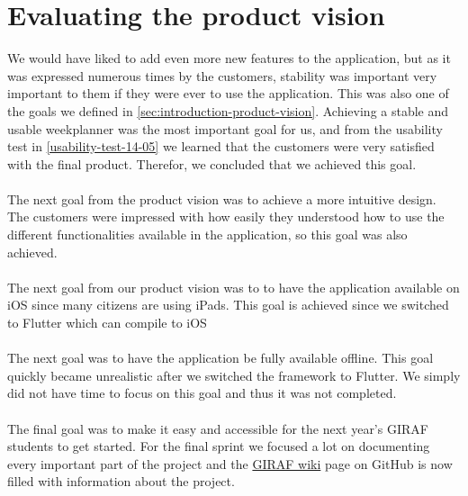 \section{Evaluating the product vision}
We would have liked to add even more new features to the application, but as it was expressed numerous times by the customers, stability was important very important to them if they were ever to use the application.
This was also one of the goals we defined in \autoref{sec:introduction-product-vision}.
Achieving a stable and usable weekplanner was the most important goal for us, and from the usability test in \autoref{usability-test-14-05} we learned that the customers were very satisfied with the final product.
Therefor, we concluded that we achieved this goal. 
\\\\
The next goal from the product vision was to achieve a more intuitive design. The customers were impressed with how easily they understood how to use the different functionalities available in the application, so this goal was also achieved. 
\\\\
The next goal from our product vision was to to have the application available on iOS since many citizens are using iPads. This goal is achieved since we switched to Flutter which can compile to iOS
\\\\
The next goal was to have the application be fully available offline. This goal quickly became unrealistic after we switched the framework to Flutter. We simply did not have time to focus on this goal and thus it was not completed.
\\\\
The final goal was to make it easy and accessible for the next year's GIRAF students to get started. For the final sprint we focused a lot on documenting every important part of the project and the \href{https://github.com/aau-giraf/wiki}{GIRAF wiki} page on GitHub is now filled with information about the project. 

